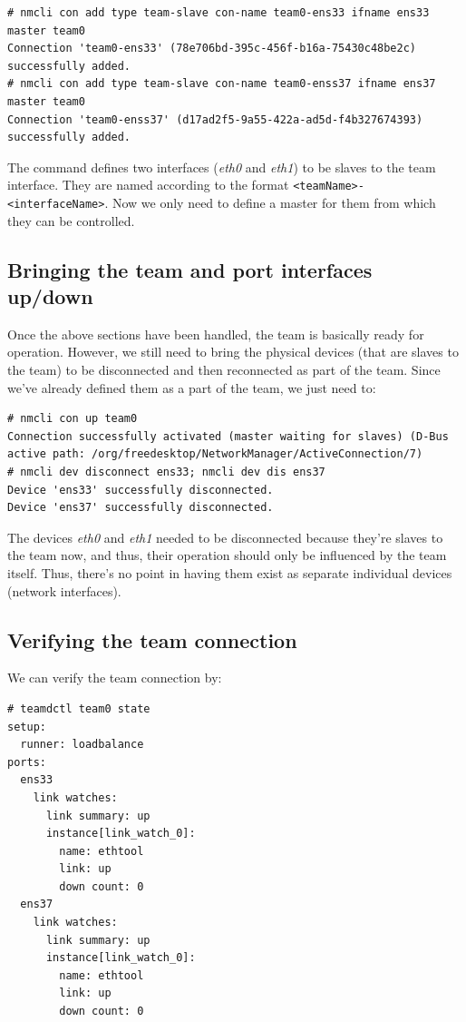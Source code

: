 \vspace{-15pt}
\begin{verbatim}
# nmcli con add type team-slave con-name team0-ens33 ifname ens33 master team0
Connection 'team0-ens33' (78e706bd-395c-456f-b16a-75430c48be2c) successfully added.
# nmcli con add type team-slave con-name team0-enss37 ifname ens37 master team0
Connection 'team0-enss37' (d17ad2f5-9a55-422a-ad5d-f4b327674393) successfully added.
\end{verbatim}
\vspace{-10pt}	

\noindent
The command defines two interfaces (\textit{eth0} and \textit{eth1}) to be slaves to the team interface. They are named according to the format \verb|<teamName>-<interfaceName>|. Now we only need to define a master for them from which they can be controlled. 

\subsection{Bringing the team and port interfaces up/down}
Once the above sections have been handled, the team is basically ready for operation. However, we still need to bring the physical devices (that are slaves to the team) to be disconnected and then reconnected as part of the team. Since we've already defined them as a part of the team, we just need to:

\vspace{-15pt}
\begin{verbatim}
# nmcli con up team0
Connection successfully activated (master waiting for slaves) (D-Bus active path: /org/freedesktop/NetworkManager/ActiveConnection/7)
# nmcli dev disconnect ens33; nmcli dev dis ens37
Device 'ens33' successfully disconnected.
Device 'ens37' successfully disconnected.
\end{verbatim}
\vspace{-10pt}	

\noindent
The devices \textit{eth0} and \textit{eth1} needed to be disconnected because they're slaves to the team now, and thus, their operation should only be influenced by the team itself. Thus, there's no point in having them exist as separate individual devices (network interfaces). 

\subsection{Verifying the team connection}
We can verify the team connection by:
\vspace{-15pt}
\begin{verbatim}
# teamdctl team0 state
setup:
  runner: loadbalance
ports:
  ens33
    link watches:
      link summary: up
      instance[link_watch_0]:
        name: ethtool
        link: up
        down count: 0
  ens37
    link watches:
      link summary: up
      instance[link_watch_0]:
        name: ethtool
        link: up
        down count: 0
\end{verbatim}
\vspace{-10pt}	

